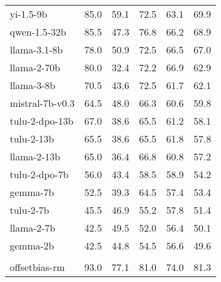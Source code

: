 \begin{table}[t!]
\begin{tabular}{@{}lccccc@{}}
\rowcolor{open} yi-1.5-9b          & 85.0             & 59.1                 & 72.5          & 63.1            & 69.9          \\
\rowcolor{open} qwen-1.5-32b       & 85.5             & 47.3                 & 76.8          & 66.2            & 68.9          \\
\rowcolor{open} llama-3.1-8b       & 78.0             & 50.9                 & 72.5          & 66.5            & 67.0          \\
\rowcolor{open} llama-2-70b        & 80.0             & 32.4                 & 72.2          & 66.9            & 62.9          \\
\rowcolor{open} llama-3-8b         & 70.5             & 43.6                 & 72.5          & 61.7            & 62.1          \\
\rowcolor{open} mistral-7b-v0.3    & 64.5             & 48.0                 & 66.3          & 60.6            & 59.8          \\
\rowcolor{open} tulu-2-dpo-13b     & 67.0             & 38.6                 & 65.5          & 61.2            & 58.1          \\
\rowcolor{open} tulu-2-13b         & 65.5             & 38.6                 & 65.5          & 61.8            & 57.8          \\
\rowcolor{open} llama-2-13b        & 65.0             & 36.4                 & 66.8          & 60.8            & 57.2          \\
\rowcolor{open} tulu-2-dpo-7b      & 56.0             & 43.4                 & 58.5          & 58.9            & 54.2          \\
\rowcolor{open} gemma-7b           & 52.5             & 39.3                 & 64.5          & 57.4            & 53.4          \\
\rowcolor{open} tulu-2-7b          & 45.5             & 46.9                 & 55.2          & 57.8            & 51.4          \\
\rowcolor{open} llama-2-7b         & 42.5             & 49.5                 & 52.0          & 56.4            & 50.1          \\
\rowcolor{open} gemma-2b           & 42.5             & 44.8                 & 54.5          & 56.6            & 49.6          \\
\rowcolor{rmrow!15}\multicolumn{6}{l}{Reward Models}  \\ 
\rowcolor{rm} offsetbias-rm      & 93.0             & 77.1                 & 81.0          & 74.0            & 81.3          \\

\end{tabular}
\end{table}
